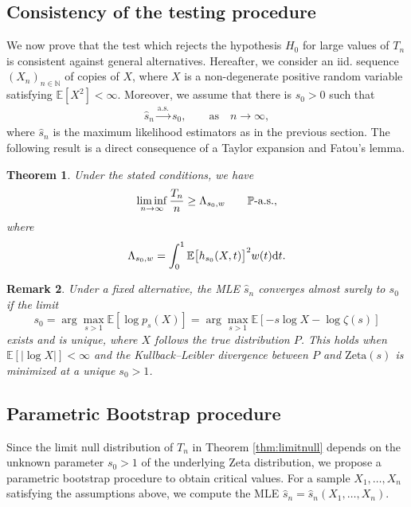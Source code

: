 \documentclass{article}
\theoremstyle{thm}
\newtheorem{theorem}{Theorem}[section]
\theoremstyle{def}
\newtheorem{remark}[theorem]{Remark}
\newcommand{\N}{\mathbb{N}} %
\begin{document}
\subsection{Consistency of the testing procedure}
We now prove that the test which rejects the hypothesis $H_0$ for large values of $T_n$ is consistent against general alternatives. Hereafter, we consider an iid. sequence $(X_n)_{n\in \N}$ of copies of $X$, where  \(X\) is a non-degenerate positive random variable satisfying \(\mathbb{E}[X^2] < \infty\). Moreover, we assume that there is \(s_0>0\) such that
\begin{align}
\widehat{s}_{n} \stackrel{\text{a.s.}}{\longrightarrow} s_0, \qquad \text{as} \quad n \rightarrow \infty,
\label{consistency_convergence_estimators}
\end{align}
where \(\widehat{s}_{n}\) is the maximum likelihood estimators as in the previous section. The following result is a direct consequence of a Taylor expansion and Fatou's lemma.
\begin{theorem}\label{thm:consistency}
Under the stated conditions, we have
\begin{align*}
\liminf_{n \rightarrow \infty} \frac{T_n}{n} \geq \Lambda_{s_0,w} \qquad \mathbb{P} \textnormal{-a.s.},
\end{align*}
where
\begin{align*}
\Lambda_{s_0,w}= \int_{0}^{1} \mathbb{E}\big[h_{s_0}(X,t)\big]^2 w(t){\rm d}t.
\end{align*}
\end{theorem}

\begin{remark}
Under a fixed alternative, the MLE $\widehat{s}_n$ converges almost surely to $s_0$ if the limit
\[
s_0=\arg\max_{s>1}\mathbb{E}\left[\log p_s(X)\right]
=\arg\max_{s>1}\mathbb{E}\left[-s\log X-\log\zeta(s)\right]
\]
exists and is unique, where $X$ follows the true distribution $P$.
This holds when $\mathbb{E}[|\log X|]<\infty$ and the Kullback--Leibler divergence between
$P$ and $\mathrm{Zeta}(s)$ is minimized at a unique $s_0>1$.
\end{remark}
\subsection{Parametric Bootstrap procedure}\label{subsec:Boot}
Since the limit null distribution of $T_n$ in Theorem \ref{thm:limitnull} depends on the unknown parameter $s_0>1$ of the underlying
Zeta distribution, we propose a parametric bootstrap procedure to obtain critical values.
For a sample $X_1,\ldots,X_n$ satisfying the assumptions above, we compute the MLE
$\widehat{s}_n=\widehat{s}_n(X_1,\ldots,X_n)$.
\end{document}
